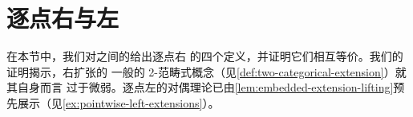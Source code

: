 \providecommand{\HomA}{\mathrm{Hom}_{A}}
\providecommand{\HomB}{\mathrm{Hom}_{B}}
\providecommand{\HomC}{\mathrm{Hom}_{C}}
\providecommand{\HomD}{\mathrm{Hom}_{D}}
\providecommand{\HomE}{\mathrm{Hom}_{E}}
\providecommand{\Nearrow}{\rotatebox[origin=c]{45}{$\Rightarrow$}}

\section{逐点右\trKanExtension{}与左\trKanExtension}\label{sec:pointwise-right-and-left-kan-extensions}

在本节中，我们对\trInfinityCategory{}之间的\trFunctor{}给出逐点右%
\trKanExtension{}的四个定义，并证明它们相互等价。我们的证明揭示，右扩张的
一般的 2-范畴式概念（见\cref{def:two-categorical-extension}）就其自身而言
过于微弱。逐点左\trKanExtension{}的对偶理论已由\cref{lem:embedded-extension-lifting}预先展示（见\cref{ex:pointwise-left-extensions}）。

